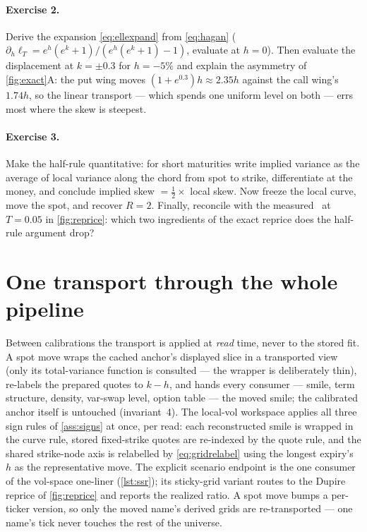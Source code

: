 \documentclass[11pt]{article}
\begin{document}
\paragraph{Exercise 2.}
Derive the expansion \eqref{eq:ellexpand} from \eqref{eq:hagan}
($\partial_h\ell_T=e^{h}(e^{k}+1)/(e^{h}(e^{k}+1)-1)$, evaluate at
$h=0$).  Then evaluate the displacement at $k=\pm0.3$ for
$h=-5\%$ and explain the asymmetry of \cref{fig:exact}A: the put wing
moves $(1+e^{0.3})h\approx2.35h$ against the call wing's $1.74h$, so
the linear transport --- which spends one uniform level on both ---
errs most where the skew is steepest.

\paragraph{Exercise 3.}
Make the half-rule quantitative: for short maturities write implied
variance as the average of local variance along the chord from spot to
strike, differentiate at the money, and conclude implied skew
$=\tfrac12\times$ local skew.  Now freeze the local curve, move the
spot, and recover $R=2$.  Finally, reconcile with the measured
\smdssrshort\ at $T=0.05$ in \cref{fig:reprice}: which two ingredients
of the exact reprice does the half-rule argument drop?

\section{One transport through the whole pipeline}
\label{sec:thread}

Between calibrations the transport is applied at \emph{read} time,
never to the stored fit.  A spot move wraps the cached anchor's
displayed slice in a transported view (only its total-variance function
is consulted --- the wrapper is deliberately thin), re-labels the
prepared quotes to $k-h$, and hands every consumer --- smile, term
structure, density, var-swap level, option table --- the moved smile;
the calibrated anchor itself is untouched (invariant~4).  The local-vol
workspace applies all three sign rules of \cref{ass:signs} at once, per
read: each reconstructed smile is wrapped in the curve rule, stored
fixed-strike quotes are re-indexed by the quote rule, and the shared
strike-node axis is relabelled by \eqref{eq:gridrelabel} using the
longest expiry's $h$ as the representative move.  The explicit scenario
endpoint is the one consumer of the vol-space one-liner
(\cref{lst:ssr}); its sticky-grid variant routes to the Dupire reprice
of \cref{fig:reprice} and reports the realized ratio.  A spot move
bumps a per-ticker version, so only the moved name's derived grids are
re-transported --- one name's tick never touches the rest of the
universe.
\end{document}
